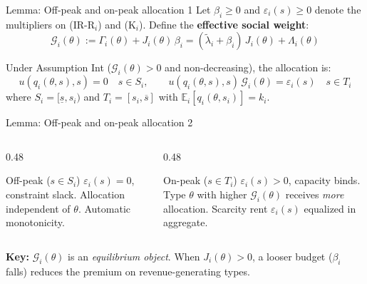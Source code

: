 \documentclass[10pt, aspectratio=169]{beamer}
\newcommand{\E}{\mathbb{E}}
\newcommand{\G}{\mathcal{G}}
\begin{document}
\begin{frame}{Lemma: Off-peak and on-peak allocation 1}
Let $\beta_i \geq 0$ and $\varepsilon_i(s) \geq 0$ denote the multipliers on (IR-R$_i$) and (K$_i$). Define the \textbf{effective social weight}:
\[ \G_i(\theta) := \Gamma_i(\theta) + J_i(\theta)\,\beta_i = (\tilde{\lambda}_i + \beta_i)\,J_i(\theta) + \Lambda_i(\theta) \]
\begin{lemma}
Under Assumption Int ($\G_i(\theta) > 0$ and non-decreasing), the allocation is:
\[ u(q_i(\theta,s),s) = 0 \quad s \in S_i, \qquad u(q_i(\theta,s),s)\,\G_i(\theta) = \varepsilon_i(s) \quad s \in T_i \tag{SB-S/T} \]
where $S_i = [\underline{s}, s_i)$ and $T_i = [s_i, \overline{s}]$ with $\E_i[q_i(\theta,s_i)] = k_i$.
\end{lemma}
\end{frame}
\begin{frame}{Lemma: Off-peak and on-peak allocation 2}

\begin{columns}
\begin{column}{0.48\textwidth}
\begin{block}{Off-peak ($s \in S_i$)}
$\varepsilon_i(s) = 0$, constraint slack. Allocation independent of $\theta$. Automatic monotonicity.
\end{block}
\end{column}
\begin{column}{0.48\textwidth}
\begin{block}{On-peak ($s \in T_i$)}
$\varepsilon_i(s) > 0$, capacity binds. Type $\theta$ with higher $\G_i(\theta)$ receives \emph{more} allocation. Scarcity rent $\varepsilon_i(s)$ equalized in aggregate.
\end{block}
\end{column}
\end{columns}
\vspace{0.2cm}
\textbf{Key:} $\G_i(\theta)$ is an \emph{equilibrium object}. When $J_i(\theta) > 0$, a looser budget ($\beta_i$ falls) reduces the premium on revenue-generating types.
\end{frame}
\end{document}
